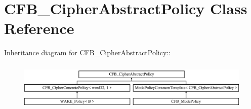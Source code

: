 \hypertarget{class_c_f_b___cipher_abstract_policy}{
\section{CFB\_\-CipherAbstractPolicy Class Reference}
\label{class_c_f_b___cipher_abstract_policy}
}
Inheritance diagram for CFB\_\-CipherAbstractPolicy::\begin{figure}[H]
\begin{center}
\leavevmode
\includegraphics[height=2.32687cm]{class_c_f_b___cipher_abstract_policy}
\end{center}
\end{figure}
